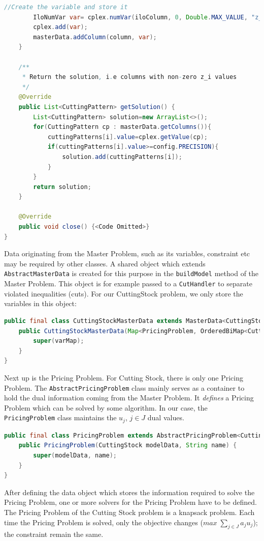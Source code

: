 \documentclass[a4paper]{article}
\newenvironment{myblock}[1]{%
    \tcolorbox[beamer,%
    noparskip,breakable,
    colback=lightBlueCodeBlock,colframe=darkBlueCodeBlock,%
    colbacklower=darkBlueCodeBlock!75!lightBlueCodeBlock,%
    coltitle=blueTitleCodeBlock,
    title=#1]}%
    {\endtcolorbox}
\newcommand{\code}[1]{\lstinline[language=java, style=seminar]!#1!}
\begin{document}
\begin{myblock}{Master}
\begin{lstlisting}[language=java, style=eclipseArticle, xleftmargin=2em]
		//Create the variable and store it
		IloNumVar var= cplex.numVar(iloColumn, 0, Double.MAX_VALUE, "z_"+","+masterData.getNrColumns());
		cplex.add(var);
		masterData.addColumn(column, var);
	}

	/**
	 * Return the solution, i.e columns with non-zero z_i values
	 */
	@Override
	public List<CuttingPattern> getSolution() {
		List<CuttingPattern> solution=new ArrayList<>();
		for(CuttingPattern cp : masterData.getColumns()){
			cuttingPatterns[i].value=cplex.getValue(cp);
			if(cuttingPatterns[i].value>=config.PRECISION){
				solution.add(cuttingPatterns[i]);
			}
		}
		return solution;
	}

	@Override
	public void close() {<Code Omitted>}	
}
\end{lstlisting}
\end{myblock}
Data originating from the Master Problem, such as its variables, constraint etc may be required by other classes. A shared object which extends \code{AbstractMasterData} is created for this purpose in the \code{buildModel} method of the Master Problem. This object is for example passed to a \code{CutHandler} to separate violated inequalities (cuts). For our CuttingStock problem, we only store the variables in this object:

\begin{myblock}{CuttingStockMasterData}
\begin{lstlisting}[language=java, style=eclipseArticle, xleftmargin=2em]  
public final class CuttingStockMasterData extends MasterData<CuttingStock, CuttingPattern, PricingProblem, IloNumVar>{
    public CuttingStockMasterData(Map<PricingProblem, OrderedBiMap<CuttingPattern, IloNumVar>> varMap) {
        super(varMap);
    }
}
\end{lstlisting}
\end{myblock}

Next up is the Pricing Problem. For Cutting Stock, there is only one Pricing Problem.  The \code{AbstractPricingProblem} class mainly serves as a container to hold the dual information coming from the Master Problem. It \emph{defines} a Pricing Problem which can be solved by some algorithm. In our case, the \code{PricingProblem} class maintains the $u_j$, $j\in J$ dual values.
\begin{myblock}{PricingProblem}
\begin{lstlisting}[language=java, style=eclipseArticle, xleftmargin=2em]  
public final class PricingProblem extends AbstractPricingProblem<CuttingStock> {
	public PricingProblem(CuttingStock modelData, String name) {
		super(modelData, name);
	}
}
\end{lstlisting}
\end{myblock}
After defining the data object which stores the information required to solve the Pricing Problem, one or more solvers for the Pricing Problem have to be defined. The Pricing Problem of the Cutting Stock problem is a knapsack problem. Each time the Pricing Problem is solved, only the objective changes ($max\; \sum_{j\in J} a_ju_j$); the constraint remain the same.
\end{document}

